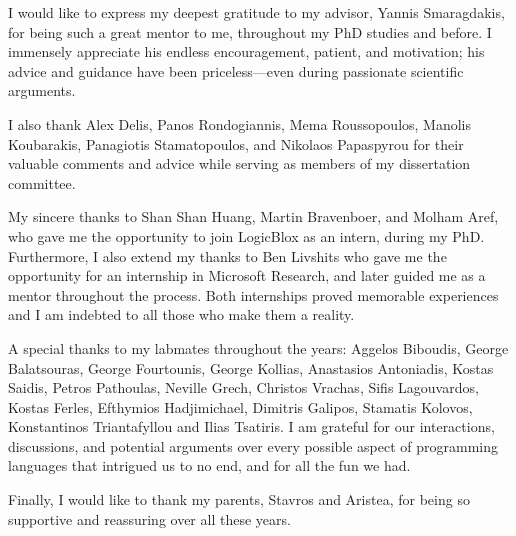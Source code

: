 I would like to express my deepest gratitude to my advisor, Yannis Smaragdakis, for being such a great mentor to me, throughout my PhD studies and before. I immensely appreciate his endless encouragement, patient, and motivation; his advice and guidance have been priceless---even during passionate scientific arguments.

I also thank Alex Delis, Panos Rondogiannis, Mema Roussopoulos, Manolis Koubarakis, Panagiotis Stamatopoulos, and Nikolaos Papaspyrou for their valuable comments and advice while serving as members of my dissertation committee.

My sincere thanks to Shan Shan Huang, Martin Bravenboer, and Molham Aref, who gave me the opportunity to join LogicBlox as an intern, during my PhD. Furthermore, I also extend my thanks to Ben Livshits who gave me the opportunity for an internship in Microsoft Research, and later guided me as a mentor throughout the process. Both internships proved memorable experiences and I am indebted to all those who make them a reality.

A special thanks to my labmates throughout the years: Aggelos Biboudis, George Balatsouras, George Fourtounis, George Kollias, Anastasios Antoniadis, Kostas Saidis, Petros Pathoulas, Neville Grech, Christos Vrachas, Sifis Lagouvardos, Kostas Ferles, Efthymios Hadjimichael, Dimitris Galipos, Stamatis Kolovos, Konstantinos Triantafyllou and Ilias Tsatiris. I am grateful for our interactions, discussions, and potential arguments over every possible aspect of programming languages that intrigued us to no end, and for all the fun we had.

Finally, I would like to thank my parents, Stavros and Aristea, for being so supportive and reassuring over all these years.